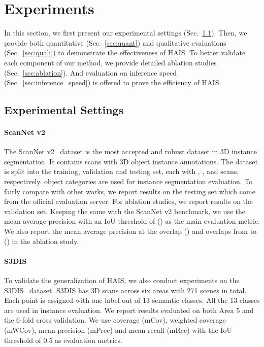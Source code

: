 \documentclass[10pt,twocolumn,letterpaper]{article}
\newcommand{\thename}{HAIS}
\begin{document}
\section{Experiments}
In this section, we first present our experimental settings (Sec.~\ref{sec:exp_setting}).
Then, we provide both quantitative (Sec.~\ref{sec:quant}) and qualitative evaluations (Sec.~\ref{sec:quali}) to demonstrate the effectiveness of \thename.
To better validate each component of our method, we provide detailed ablation studies (Sec.~\ref{sec:ablation}).
And evaluation on inference speed (Sec.~\ref{sec:inference_speed}) is offered to prove the efficiency of \thename.

\subsection{Experimental Settings}
\label{sec:exp_setting}
\paragraph{ScanNet v2} 
The ScanNet v2~\cite{ScanNet} dataset 
is the most accepted and robust dataset in 3D instance segmentation.
It contains  scans with 3D object instance annotations. The dataset is split into the training, validation and testing set, each with , , and  scans, respectively.  object categories are used for instance segmentation evaluation. 
To fairly compare with other works, we report results on the testing set which come from the official evaluation server.
For ablation studies, we report results on the validation set. 
Keeping the same with the ScanNet v2 benchmark, we use the mean average precision with an IoU threshold of  () as the main evaluation metric.
We also report the mean average precision at the overlap  () and overlaps from  to  () in the ablation study.

\paragraph{S3DIS} 
To validate the generalization of \thename, we also conduct experiments on
the S3DIS~\cite{S3DIS} dataset. S3DIS has 3D scans across six areas with 271 scenes in total. 
Each point is assigned with one label out of 13 semantic classes. All the 13 classes are used in instance evaluation.
We report results evaluated on both Area 5 and the 6-fold cross  validation.
We use coverage (mCov), weighted coverage (mWCov), mean precision (mPrec) and mean recall (mRec) with the IoU threshold of 0.5 as evaluation metrics.
\end{document}
